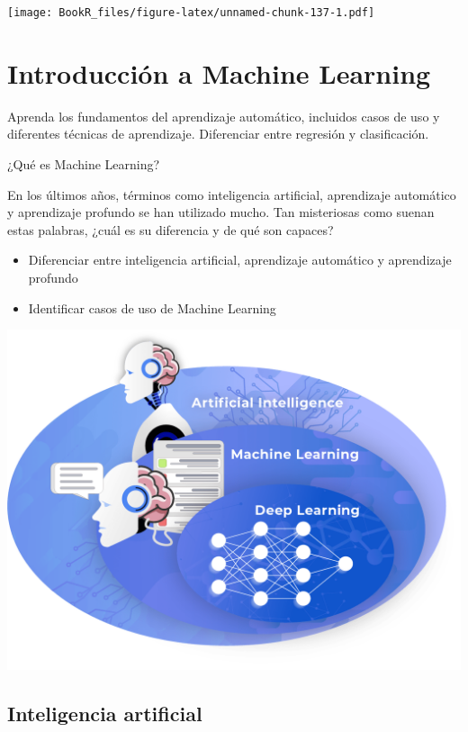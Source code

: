 \documentclass[
]{book}
\providecommand{\tightlist}{%
  \setlength{\itemsep}{0pt}\setlength{\parskip}{0pt}}
\begin{document}
\texttt{[image: BookR\_files/figure-latex/unnamed-chunk-137-1.pdf]}

\hypertarget{introducciuxf3n-a-machine-learning}{%
\chapter{Introducción a Machine Learning}\label{introducciuxf3n-a-machine-learning}}

Aprenda los fundamentos del aprendizaje automático, incluidos casos de uso y diferentes técnicas de aprendizaje. Diferenciar entre regresión y clasificación.

¿Qué es Machine Learning?

En los últimos años, términos como inteligencia artificial, aprendizaje automático y aprendizaje profundo se han utilizado mucho. Tan misteriosas como suenan estas palabras, ¿cuál es su diferencia y de qué son capaces?

\begin{itemize}
\tightlist
\item
  Diferenciar entre inteligencia artificial, aprendizaje automático y aprendizaje profundo
\item
  Identificar casos de uso de Machine Learning
\end{itemize}

\includegraphics{img/int.png}

\hypertarget{inteligencia-artificial}{%
\section{Inteligencia artificial}\label{inteligencia-artificial}}
\end{document}

